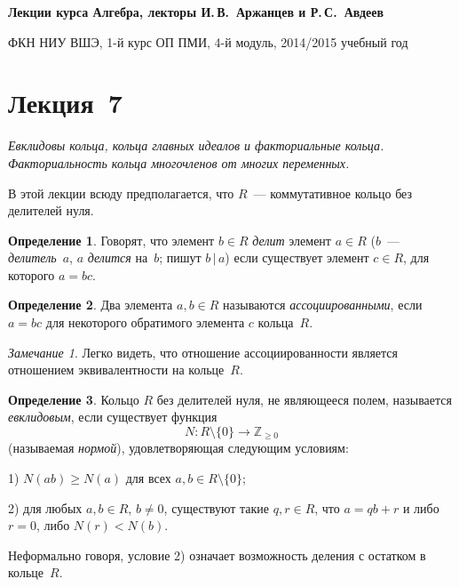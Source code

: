 \documentclass[a4paper,10pt]{amsart}
\def\ZZ{{\mathbb Z}}%
\theoremstyle{definition}
\newtheorem{definition}{Определение}
\theoremstyle{remark}
\newtheorem{remark}{Замечание}
\begin{document}
%
\sloppy
%
\centerline{\large \bf Лекции курса \guillemotleft
Алгебра\guillemotright{}, лекторы И.\,В.~Аржанцев и Р.\,С.~Авдеев}

\smallskip

\centerline{\large ФКН НИУ ВШЭ, 1-й курс ОП ПМИ, 4-й модуль,
2014/2015 учебный год}


\bigskip

\section*{Лекция~7}

\medskip

{\it Евклидовы кольца, кольца главных идеалов и факториальные
кольца. Факториальность кольца многочленов от многих переменных.}

\medskip

В этой лекции всюду предполагается, что $R$~--- коммутативное кольцо
без делителей нуля.

\begin{definition}
Говорят, что элемент $b \in R$ {\it делит} элемент $a\in R$ ($b$~---
\textit{делитель}~$a$, $a$ \textit{делится} на~$b$; пишут $b \,|\,
a$) если существует элемент $c\in R$, для которого $a=bc$.
\end{definition}

\begin{definition}
Два элемента $a, b \in R$ называются {\it ассоциированными}, если
$a=bc$ для некоторого обратимого элемента $c$ кольца~$R$.
\end{definition}

\begin{remark}
Легко видеть, что отношение ассоциированности является отношением
эквивалентности на кольце~$R$.
\end{remark}

\begin{definition}
Кольцо $R$ без делителей нуля, не являющееся полем, называется {\it
евклидовым}, если существует функция
$$
N\colon R\setminus\{0\} \to \ZZ_{\geqslant 0}
$$
(называемая {\it нормой}), удовлетворяющая следующим условиям:

1) $N(ab) \geqslant N(a)$ для всех $a, b \in R \setminus \{0\}$;

2) для любых $a, b \in R$, $b \ne 0$, существуют такие $q,r\in R$,
что $a = qb + r$ и либо $r = 0$, либо $N(r) < N(b)$.
\end{definition}

Неформально говоря, условие 2) означает возможность \guillemotleft
деления с остатком\guillemotright{} в кольце~$R$.
\end{document}
